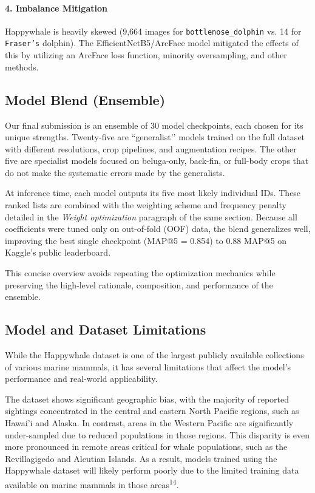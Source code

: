 \documentclass[twocolumn]{article}
\begin{document}
\paragraph{4. Imbalance Mitigation}

Happywhale is heavily skewed (9,664 images for \texttt{bottlenose\_dolphin} vs. 14 for \texttt{Fraser's} dolphin). The EfficientNetB5/ArcFace model mitigated the effects of this by utilizing an ArcFace loss function, minority oversampling, and other methods. 

\subsection{Model Blend (Ensemble)}

Our final submission is an ensemble of 30 model checkpoints, each chosen for its unique strengths. Twenty-five are “generalist’’ models trained on the full dataset with different resolutions, crop pipelines, and augmentation recipes. The other five are specialist models focused on beluga-only, back-fin, or full-body crops that do not make the systematic errors made by the generalists.

At inference time, each model outputs its five most likely individual IDs. These ranked lists are combined with the weighting scheme and frequency penalty detailed in the \textit{Weight optimization} paragraph of the same section. Because all coefficients were tuned only on out-of-fold (OOF) data, the blend generalizes well, improving the best single checkpoint (MAP@5 = 0.854) to 0.88 MAP@5 on Kaggle’s public leaderboard.

This concise overview avoids repeating the optimization mechanics while preserving the high-level rationale, composition, and performance of the ensemble.

\subsection{Model and Dataset Limitations}

While the Happywhale dataset is one of the largest publicly available collections of various marine mammals, it has several limitations that affect the model's performance and real-world applicability. 

The dataset shows significant geographic bias, with the majority of reported sightings concentrated in the central and eastern North Pacific regions, such as Hawai'i and Alaska. In contrast, areas in the Western Pacific are significantly under-sampled due to reduced populations in those regions. This disparity is even more pronounced in remote areas critical for whale populations, such as the Revillagigedo and Aleutian Islands. As a result, models trained using the Happywhale dataset will likely perform poorly due to the limited training data available on marine mammals in those areas\textsuperscript{14}.
\end{document}
